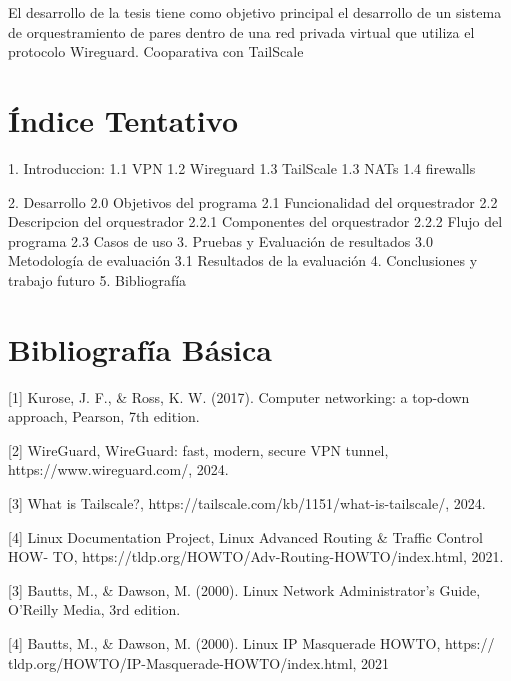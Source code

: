 \documentclass{article}
\begin{document}
El desarrollo de la tesis tiene como objetivo principal el desarrollo de un sistema de orquestramiento de pares dentro de una red privada virtual que utiliza el protocolo Wireguard.
Cooparativa con TailScale

\section{Índice Tentativo}

1. Introduccion:
    1.1 VPN
    1.2 Wireguard
    1.3 TailScale
    1.3 NATs
    1.4 firewalls

2. Desarrollo
    2.0 Objetivos del programa
    2.1 Funcionalidad del orquestrador
    2.2 Descripcion del orquestrador
    2.2.1 Componentes del orquestrador
    2.2.2 Flujo del programa
    2.3 Casos de uso
3. Pruebas y Evaluación de resultados 
    3.0 Metodología de evaluación
    3.1 Resultados de la evaluación
4. Conclusiones y trabajo futuro 
5. Bibliografía 

\section{Bibliografía Básica}
[1] Kurose, J. F., & Ross, K. W. (2017). Computer networking: a top-down approach,
Pearson, 7th edition.

[2] WireGuard, WireGuard: fast, modern, secure VPN tunnel, https://www.wireguard.com/, 2024.

[3] What is Tailscale?, https://tailscale.com/kb/1151/what-is-tailscale/, 2024.

[4] Linux Documentation Project, Linux Advanced Routing & Traffic Control HOW-
TO, https://tldp.org/HOWTO/Adv-Routing-HOWTO/index.html, 2021.

[3] Bautts, M., & Dawson, M. (2000). Linux Network Administrator’s Guide, O’Reilly
Media, 3rd edition.

[4] Bautts, M., & Dawson, M. (2000). Linux IP Masquerade HOWTO, https://
tldp.org/HOWTO/IP-Masquerade-HOWTO/index.html, 2021
\end{document}
